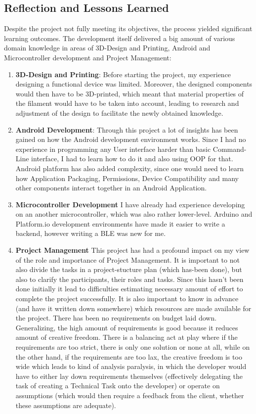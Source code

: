 \subsection{Reflection and Lessons Learned} 
Despite the project not fully meeting its objectives, the process yielded significant learning outcomes. The development itself delivered a big amount of various domain knowledge in areas of 3D-Design and Printing, Android and Microcontroller development and Project Management:
\begin{enumerate}
	\item \textbf{3D-Design and Printing}: Before starting the project, my experience designing a functional device was limited. Moreover, the designed components would then have to be 3D-printed, which meant that material properties of the filament would have to be taken into account, leading to research and adjustment of the design to facilitate the newly obtained knowledge.
	\item \textbf{Android Development}: Through this project a lot of insights has been gained on how the Android development environment works. Since I had no experience in programming any User interface harder than basic Command-Line interface, I had to learn how to do it and also using \ac{OOP} for that. Android platform has also added complexity, since one would need to learn how Application Packaging, Permissions, Device Compatibility and many other components interact together in an Android Application.
	\item \textbf{Microcontroller Development} I have already had experience developing on an another microcontroller, which was also rather lower-level. Arduino and Platform.io development environments have made it easier to write a backend, however writing a \ac{BLE} was new for me. 
	\item \textbf{Project Management} This project has had a profound impact on my view of the role and importance of Project Management. It is important to not also divide the tasks in a project-stucture plan (which has-been done), but also to clarify the participants, their roles and tasks. Since this hasn't been done initially it lead to difficulties estimating necessary amount of effort to complete the project successfully. It is also important to know in advance (and have it written down somewhere) which resources are made available for the project. There has been no requirements on budget laid down. Generalizing, the high amount of requirements is good because it reduces amount of creative freedom. There is a balancing act at play where if the requirements are too strict, there is only one solution or none at all, while on the other hand, if the requirements are too lax, the creative freedom is too wide which leads to kind of analysis paralysis, in which the developer would have to either lay down requirements themselves (effectively delegating the task of creating a Technical Task onto the developer) or operate on assumptions (which would then require a feedback from the client, whether these assumptions are adequate).
\end{enumerate}


